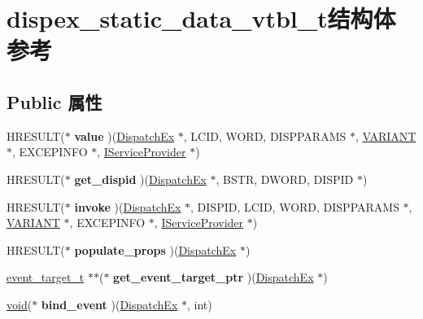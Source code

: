 \hypertarget{structdispex__static__data__vtbl__t}{}\section{dispex\+\_\+static\+\_\+data\+\_\+vtbl\+\_\+t结构体 参考}
\label{structdispex__static__data__vtbl__t}
\subsection*{Public 属性}
\begin{DoxyCompactItemize}
\item 
\mbox{\label{structdispex__static__data__vtbl__t_a3dd9b4a806bb29102fa7f481a8b823f1}} 
H\+R\+E\+S\+U\+LT($\ast$ {\bfseries value} )(\hyperlink{struct_dispatch_ex}{Dispatch\+Ex} $\ast$, L\+C\+ID, W\+O\+RD, D\+I\+S\+P\+P\+A\+R\+A\+MS $\ast$, \hyperlink{structtag_v_a_r_i_a_n_t}{V\+A\+R\+I\+A\+NT} $\ast$, E\+X\+C\+E\+P\+I\+N\+FO $\ast$, \hyperlink{interface_i_service_provider}{I\+Service\+Provider} $\ast$)
\item 
\mbox{\label{structdispex__static__data__vtbl__t_a84adaddfe9642864405ba13f2c9c34c3}} 
H\+R\+E\+S\+U\+LT($\ast$ {\bfseries get\+\_\+dispid} )(\hyperlink{struct_dispatch_ex}{Dispatch\+Ex} $\ast$, B\+S\+TR, D\+W\+O\+RD, D\+I\+S\+P\+ID $\ast$)
\item 
\mbox{\label{structdispex__static__data__vtbl__t_adf65ddaceaa642103aa5b2abb06c7f6d}} 
H\+R\+E\+S\+U\+LT($\ast$ {\bfseries invoke} )(\hyperlink{struct_dispatch_ex}{Dispatch\+Ex} $\ast$, D\+I\+S\+P\+ID, L\+C\+ID, W\+O\+RD, D\+I\+S\+P\+P\+A\+R\+A\+MS $\ast$, \hyperlink{structtag_v_a_r_i_a_n_t}{V\+A\+R\+I\+A\+NT} $\ast$, E\+X\+C\+E\+P\+I\+N\+FO $\ast$, \hyperlink{interface_i_service_provider}{I\+Service\+Provider} $\ast$)
\item 
\mbox{\label{structdispex__static__data__vtbl__t_a267e8f30a608988b47e43550b0b3bcbc}} 
H\+R\+E\+S\+U\+LT($\ast$ {\bfseries populate\+\_\+props} )(\hyperlink{struct_dispatch_ex}{Dispatch\+Ex} $\ast$)
\item 
\mbox{\label{structdispex__static__data__vtbl__t_aeef73f4c2670a03e6061687e822624bf}} 
\hyperlink{structevent__target__t}{event\+\_\+target\+\_\+t} $\ast$$\ast$($\ast$ {\bfseries get\+\_\+event\+\_\+target\+\_\+ptr} )(\hyperlink{struct_dispatch_ex}{Dispatch\+Ex} $\ast$)
\item 
\mbox{\label{structdispex__static__data__vtbl__t_ad45aa1ae18744728a3fd33c71e8e8e0c}} 
\hyperlink{interfacevoid}{void}($\ast$ {\bfseries bind\+\_\+event} )(\hyperlink{struct_dispatch_ex}{Dispatch\+Ex} $\ast$, int)
\end{DoxyCompactItemize}


